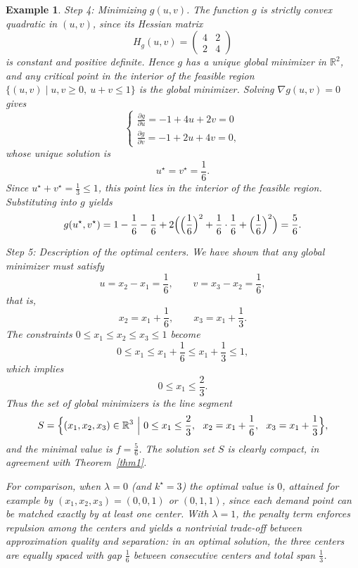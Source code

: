 \documentclass[11pt]{article}
\newtheorem{example}[theorem]{Example}
\theoremstyle{definition}
\newcommand{\R}{\mathbb{R}}
\newcommand{\1}{\mathbf{1}}
\begin{document}
\begin{example}
{\medskip\noindent
\emph{Step 4: Minimizing $g(u,v)$.}
The function $g$ is strictly convex quadratic in $(u,v)$, since its Hessian matrix
$$H_g(u,v) = \begin{pmatrix} 4 & 2 \\ 2 & 4 \end{pmatrix}$$
is constant and positive definite. Hence $g$ has a unique global minimizer in
$\R^2$, and any critical point in the interior of the feasible region
$\{(u,v)\mid u,v\ge0,\ u+v\le1\}$ is the global minimizer.
Solving $\nabla g(u,v)=0$ gives
\[
\begin{cases}
\displaystyle \frac{\partial g}{\partial u}
=-1+4u+2v=0\\[0.4em]
\displaystyle \frac{\partial g}{\partial v}
=-1+2u+4v=0,
\end{cases}
\]
whose unique solution is
\[
u^\star=v^\star=\frac{1}{6}.
\]
Since $u^\star+v^\star=\frac{1}{3}\le1$, this point lies in the interior of
the feasible region. Substituting into $g$ yields
\[
g(u^\star,v^\star)
=
1-\frac{1}{6}-\frac{1}{6}
+2\Bigl(\Bigl(\frac{1}{6}\Bigr)^2
+\frac{1}{6}\cdot\frac{1}{6}
+\Bigl(\frac{1}{6}\Bigr)^2\Bigr)
=
\frac{5}{6}.
\]

\medskip\noindent
\emph{Step 5: Description of the optimal centers.}
We have shown that any global minimizer must satisfy
\[
u=x_2-x_1=\frac{1}{6},\qquad
v=x_3-x_2=\frac{1}{6},
\]
that is,
\[
x_2=x_1+\frac{1}{6},\qquad
x_3=x_1+\frac{1}{3}.
\]
The constraints $0\le x_1\le x_2\le x_3\le1$ become
\[
0\le x_1\le x_1+\frac{1}{6}\le x_1+\frac{1}{3}\le1,
\]
which implies
\[
0\le x_1\le\frac{2}{3}.
\]
Thus the set of global minimizers is the line segment
\[
S
=
\Bigl\{
(x_1,x_2,x_3)\in\R^3\ \Big|\ 
0\le x_1\le\frac{2}{3},\ \ 
x_2=x_1+\frac{1}{6},\ \ 
x_3=x_1+\frac{1}{3}
\Bigr\},
\]
and the minimal value is $f=\frac{5}{6}$. The solution set $S$ is
clearly compact, in agreement with Theorem~\ref{thm1}.

\medskip
For comparison, when $\lambda=0$ (and $k^{\star} = 3$) the optimal value is $0$, attained
for example by $(x_1,x_2,x_3)=(0,0,1)$ or $(0,1,1)$, since each demand point
can be matched exactly by at least one center. With $\lambda=1$, the penalty
term enforces repulsion among the centers and yields a nontrivial trade-off
between approximation quality and separation: in an optimal solution, the
three centers are equally spaced with gap $\frac{1}{6}$ between consecutive
centers and total span $\frac{1}{3}$.}
\end{example}
\end{document}
